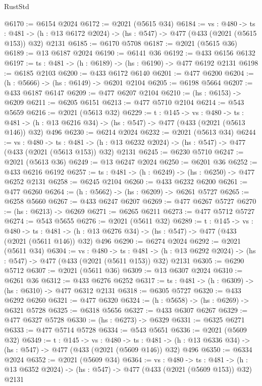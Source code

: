 \begin{lexlean}{RustStd}
\begin{coremodule}
@6170 := @6154 @2024
@6172 := @2021 (@5615 @34)
@6184 := {vs : @480} ->
  {ts : @481} -> (h : @13 @6172 @2024) -> (hs : @547) -> @477 (@433 (@2021 (@5615 @153)) @32) @2131
@6185 := @6170 @5708
@6187 := @2021 (@5615 @36)
@6189 := @13 @6187 @2024
@6190 := @6141 @36
@6192 := @433 @6156 @6132
@6197 := {ts : @481} -> (h : @6189) -> (hs : @6190) -> @477 @6192 @2131
@6198 := @6185 @2103
@6200 := @433 @6172 @6140
@6201 := @477 @6200
@6204 := (h : @5666) -> (hs : @6149) -> @6201 @2104
@6205 := @6198 @5664
@6207 := @433 @6187 @6147
@6209 := @477 @6207 @2104
@6210 := (hs : @6153) -> @6209
@6211 := @6205 @6151
@6213 := @477 @5710 @2104
@6214 := @543 @5659
@6216 := @2021 (@5613 @32)
@6229 := {t : @145} ->
  {vs : @480} ->
  {ts : @481} -> (h : @13 @6216 @34) -> (hs : @547) -> @477 (@433 (@2021 (@5613 @146)) @32) @496
@6230 := @6214 @2024
@6232 := @2021 (@5613 @34)
@6244 := {vs : @480} ->
  {ts : @481} -> (h : @13 @6232 @2024) -> (hs : @547) -> @477 (@433 (@2021 (@5613 @153)) @32) @2131
@6245 := @6230 @5710
@6247 := @2021 (@5613 @36)
@6249 := @13 @6247 @2024
@6250 := @6201 @36
@6252 := @433 @6216 @6192
@6257 := {ts : @481} -> (h : @6249) -> (hs : @6250) -> @477 @6252 @2131
@6258 := @6245 @2104
@6260 := @433 @6232 @6200
@6261 := @477 @6260
@6264 := (h : @5662) -> (hs : @6209) -> @6261 @5727
@6265 := @6258 @5660
@6267 := @433 @6247 @6207
@6269 := @477 @6267 @5727
@6270 := (hs : @6213) -> @6269
@6271 := @6265 @6211
@6273 := @477 @5712 @5727
@6274 := @543 @5655
@6276 := @2021 (@5611 @32)
@6289 := {t : @145} ->
  {vs : @480} ->
  {ts : @481} -> (h : @13 @6276 @34) -> (hs : @547) -> @477 (@433 (@2021 (@5611 @146)) @32) @496
@6290 := @6274 @2024
@6292 := @2021 (@5611 @34)
@6304 := {vs : @480} ->
  {ts : @481} -> (h : @13 @6292 @2024) -> (hs : @547) -> @477 (@433 (@2021 (@5611 @153)) @32) @2131
@6305 := @6290 @5712
@6307 := @2021 (@5611 @36)
@6309 := @13 @6307 @2024
@6310 := @6261 @36
@6312 := @433 @6276 @6252
@6317 := {ts : @481} -> (h : @6309) -> (hs : @6310) -> @477 @6312 @2131
@6318 := @6305 @5727
@6320 := @433 @6292 @6260
@6321 := @477 @6320
@6324 := (h : @5658) -> (hs : @6269) -> @6321 @5728
@6325 := @6318 @5656
@6327 := @433 @6307 @6267
@6329 := @477 @6327 @5728
@6330 := (hs : @6273) -> @6329
@6331 := @6325 @6271
@6333 := @477 @5714 @5728
@6334 := @543 @5651
@6336 := @2021 (@5609 @32)
@6349 := {t : @145} ->
  {vs : @480} ->
  {ts : @481} -> (h : @13 @6336 @34) -> (hs : @547) -> @477 (@433 (@2021 (@5609 @146)) @32) @496
@6350 := @6334 @2024
@6352 := @2021 (@5609 @34)
@6364 := {vs : @480} ->
  {ts : @481} -> (h : @13 @6352 @2024) -> (hs : @547) -> @477 (@433 (@2021 (@5609 @153)) @32) @2131

\end{coremodule}
\end{lexlean}
